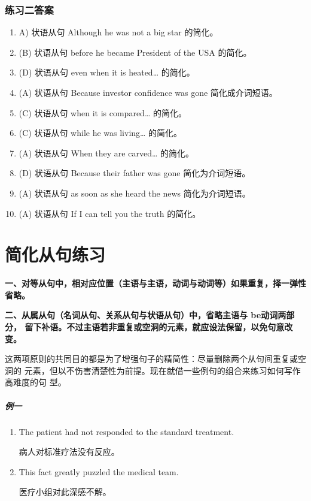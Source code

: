 \subsection{练习二答案}
\begin{enumerate}
\item A) 状语从句 Although he was not a big star 的简化。

\item(B) 状语从句 before he became President of the USA 的简化。

\item(D) 状语从句 even when it is heated… 的简化。

\item (A) 状语从句 Because investor confidence was gone 简化成介词短语。

\item (C) 状语从句 when it is compared… 的简化。

\item (C) 状语从句 while he was living… 的简化。

\item (A) 状语从句 When they are carved… 的简化。

\item (D) 状语从句 Because their father was gone 简化为介词短语。
\item (A) 状语从句 as soon as she heard the news 简化为介词短语。
\item (A) 状语从句 If I can tell you the truth 的简化。
\end{enumerate}

\chapter{简化从句练习}

\textbf{一、对等从句中，相对应位置（主语与主语，动词与动词等）如果重复，择一弹性省略。}

\textbf{二、从属从句（名词从句、关系从句与状语从句）中，省略主语与 be动词两部分，
  留下补语。不过主语若非重复或空洞的元素，就应设法保留，以免句意改变。}

这两项原则的共同目的都是为了增强句子的精简性：尽量删除两个从句间重复或空洞的
元素，但以不伤害清楚性为前提。现在就借一些例句的组合来练习如何写作高难度的句
型。

\paragraph{例一}

\begin{enumerate}
\item The patient had not responded to the standard treatment.

  病人对标准疗法没有反应。
\item This fact greatly puzzled the medical team.

  医疗小组对此深感不解。
\end{enumerate}

